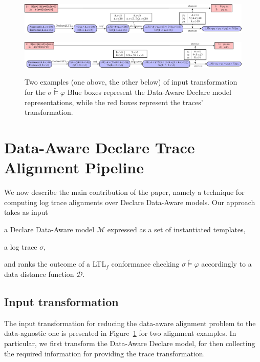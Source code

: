 \begin{figure}[!t]
{\hspace{-1.3cm}\includegraphics[width=1.3\textwidth]{images/example_1}}

{\hspace{-1.3cm}\includegraphics[width=1.3\textwidth]{images/example_2}}

\caption{Two examples (one above, the other below) of input transformation for the $\sigma\tilde{\vDash}\varphi$ Blue boxes represent the Data-Aware Declare model representations, while the red boxes represent the traces' transformation.}\label{fig:twoexamples}
\end{figure}

\section{Data-Aware Declare Trace Alignment Pipeline}\label{sec:dadtap}
We now describe the main contribution of the paper, namely a technique for computing log trace alignments over Declare Data-Aware models. Our approach takes as input \begin{enumerate*}[label=\emph{\alph*})]
	\item a Declare Data-Aware model $\mathcal{M}$ expressed as a set of instantiated templates,
	\item a log trace $\sigma$,
\end{enumerate*} and ranks the outcome of a LTL$_f$ conformance checking $\sigma\tilde{\vDash}\varphi$ accordingly to a data distance function $\mathcal{D}$.

\subsection{Input transformation}
The input transformation for reducing the data-aware alignment problem to the data-agnostic one is presented in Figure~\ref{fig:twoexamples} for two alignment examples. In particular, we first transform the Data-Aware Declare model, for then collecting the required information for providing the trace transformation.

